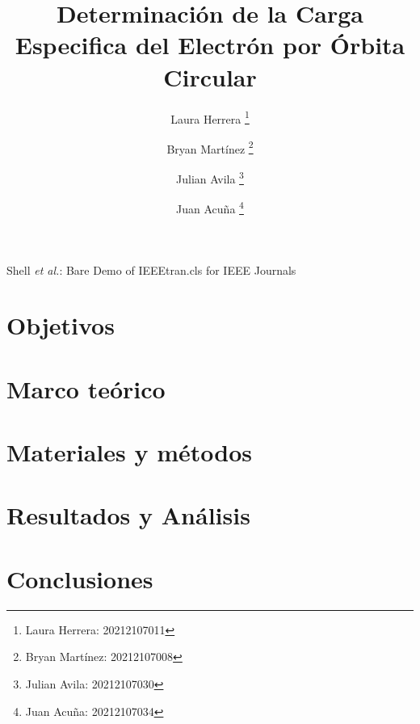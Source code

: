 \documentclass[journal, table]{IEEEtran}
\begin{document}
\title{Determinación de la Carga Especifica del Electrón por Órbita Circular}

\author[*]{Laura Herrera
    \thanks{Laura Herrera: 20212107011}}
\author[*]{Bryan Martínez
    \thanks{Bryan Martínez: 20212107008}}
\author[*]{Julian Avila
    \thanks{Julian Avila: 20212107030}}
\author[*]{Juan Acuña
    \thanks{Juan Acuña: 20212107034}}



\markboth{}
{Shell \MakeLowercase{\textit{et al.}}: Bare Demo of IEEEtran.cls for IEEE Journals}

\maketitle



\section{Objetivos}


\section{Marco teórico}


\section{Materiales y métodos}


\section{Resultados y Análisis}


\section{Conclusiones}


\printbibliography
\nocite{*}
\end{document}
